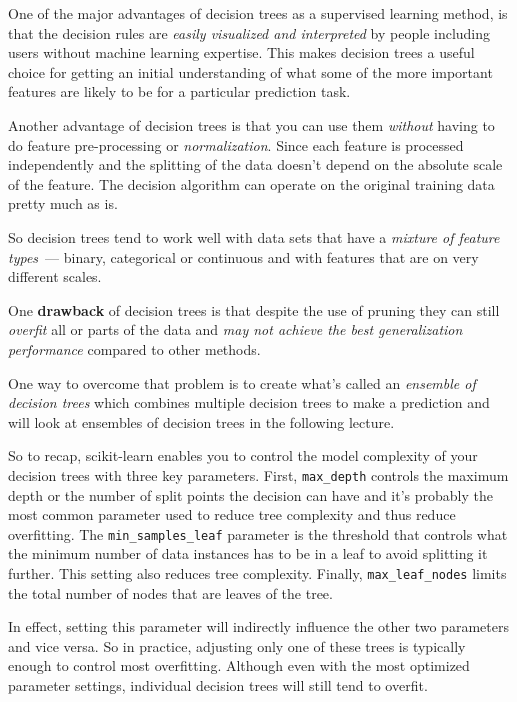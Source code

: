 \begin{multicols}{2}
One of the major advantages of decision trees as a supervised learning method, is that the decision rules are \emph{easily visualized and interpreted} by people including users without machine learning expertise.
This makes decision trees a useful choice for getting an initial understanding of what some of the more important features are likely to be for a particular prediction task. 

Another advantage of decision trees is that you can use them \emph{without} having to do feature pre-processing or \emph{normalization}. Since each feature is processed independently and the splitting of the data doesn't depend on the absolute scale of the feature. The decision algorithm can operate on the original training data pretty much as is. 

So decision trees tend to work well with data sets that have a \emph{mixture of feature types}~--- binary, categorical or continuous and with features that are on very different scales. 

One \textbf{drawback} of decision trees is that despite the use of pruning they can still \emph{overfit} all or parts of the data and \emph{may not achieve the best generalization performance} compared to other methods. 

One way to overcome that problem is to create what's called an \emph{ensemble of decision trees} which combines multiple decision trees to make a prediction and will look at ensembles of decision trees in the following lecture. 

So to recap, scikit-learn enables you to control the model complexity of your decision trees with three key parameters. First, \texttt{max_depth} controls the maximum depth or the number of split points the decision can have and it's probably the most common parameter used to reduce tree complexity and thus reduce overfitting. The \texttt{min_samples_leaf}  parameter is the threshold that controls what the minimum number of data instances has to be in a leaf to avoid splitting it further. This setting also reduces tree complexity. Finally, \texttt{max_leaf_nodes} limits the total number of nodes that are leaves of the tree. 

In effect, setting this parameter will indirectly influence the other two parameters and vice versa. So in practice, adjusting only one of these trees is typically enough to control most overfitting. Although even with the most optimized parameter settings, individual decision trees will still tend to overfit. 
\end{multicols}